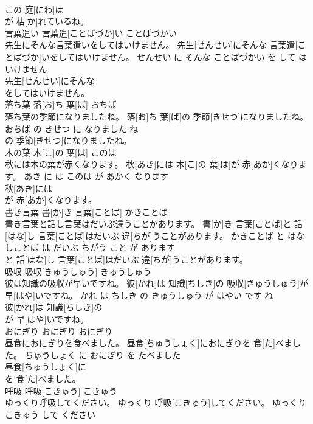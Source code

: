 \documentclass[8pt]{extreport}
\begin{document}
\begin{CJK}{UTF8}{min}
\\	この 庭[にわ]は
\\	が 枯[か]れているね。			
\\	言葉遣い	言葉遣[ことばづか]い	ことばづかい	
\\	先生にそんな言葉遣いをしてはいけません。	先生[せんせい]にそんな 言葉遣[ことばづか]いをしてはいけません。	せんせい に そんな ことばづかい を して は いけません	
\\	先生[せんせい]にそんな
\\	をしてはいけません。			
\\	落ち葉	落[お]ち 葉[ば]	おちば	
\\	落ち葉の季節になりましたね。	落[お]ち 葉[ば]の 季節[きせつ]になりましたね。	おちば の きせつ に なりました ね	
\\	の 季節[きせつ]になりましたね。			
\\	木の葉	木[こ]の 葉[は]	このは	
\\	秋には木の葉が赤くなります。	秋[あき]には 木[こ]の 葉[は]が 赤[あか]くなります。	あき に は このは が あかく なります	
\\	秋[あき]には
\\	が 赤[あか]くなります。			
\\	書き言葉	書[か]き 言葉[ことば]	かきことば	
\\	書き言葉と話し言葉はだいぶ違うことがあります。	書[か]き 言葉[ことば]と 話[はな]し 言葉[ことば]はだいぶ 違[ちが]うことがあります。	かきことば と はなしことば は だいぶ ちがう こと が あります	
\\	と 話[はな]し 言葉[ことば]はだいぶ 違[ちが]うことがあります。			
\\	吸収	吸収[きゅうしゅう]	きゅうしゅう	
\\	彼は知識の吸収が早いですね。	彼[かれ]は 知識[ちしき]の 吸収[きゅうしゅう]が 早[はや]いですね。	かれ は ちしき の きゅうしゅう が はやい です ね	
\\	彼[かれ]は 知識[ちしき]の
\\	が 早[はや]いですね。			
\\	おにぎり	おにぎり	おにぎり	
\\	昼食におにぎりを食べました。	昼食[ちゅうしょく]におにぎりを 食[た]べました。	ちゅうしょく に おにぎり を たべました	
\\	昼食[ちゅうしょく]に
\\	を 食[た]べました。			
\\	呼吸	呼吸[こきゅう]	こきゅう	
\\	ゆっくり呼吸してください。	ゆっくり 呼吸[こきゅう]してください。	ゆっくり こきゅう して ください	

\end{CJK}
\end{document}
